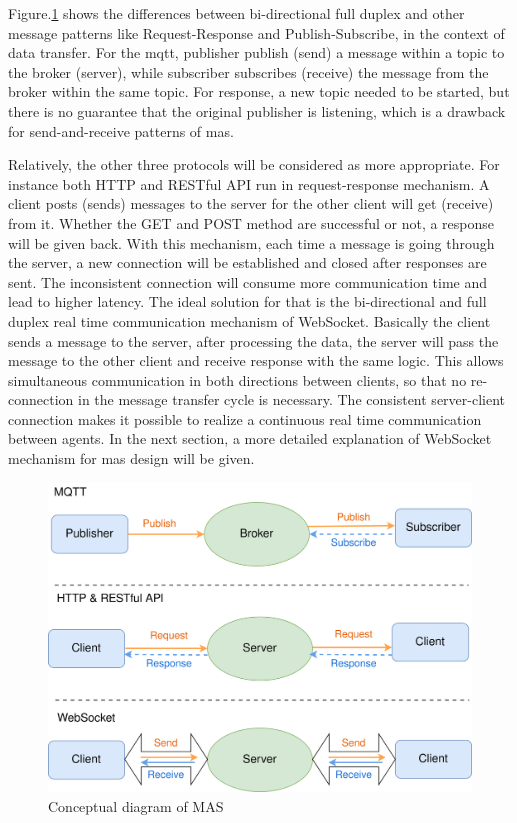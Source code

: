 Figure.\ref{fig: MsgConceptual} shows the differences between bi-directional full duplex and other message patterns like Request-Response and Publish-Subscribe, in the context of data transfer. 
For the \gls{mqtt}, publisher publish (send) a message within a topic to the broker (server), while subscriber subscribes (receive) the message from the broker within the same topic. 
For response, a new topic needed to be started, but there is no guarantee that the original publisher is listening, which is a drawback for send-and-receive patterns of \gls{mas}. 

Relatively, the other three protocols will be considered as more appropriate. 
For instance both HTTP and RESTful API run in request-response mechanism. 
A client posts (sends) messages to the server for the other client will get (receive) from it. 
Whether the GET and POST method are successful or not, a response will be given back. With this mechanism, each time a message is going through the server, a new connection will be established and closed after responses are sent. 
The inconsistent connection will consume more communication time and lead to higher latency. 
The ideal solution for that is the bi-directional and full duplex real time communication mechanism of WebSocket. 
Basically the client sends a message to the server, after processing the data, the server will pass the message to the other client and receive response with the same logic. This allows simultaneous communication in both directions between clients, so that no re-connection in the message transfer cycle is necessary. The consistent server-client connection makes it possible to realize a continuous real time communication between agents. In the next section, a more detailed explanation of WebSocket mechanism for \gls{mas} design will be given.

\begin{figure}[htb]
\includegraphics[width=12cm]{figures/MessageConceptual.png}
\centering
\caption{Conceptual diagram of MAS\label{fig: MsgConceptual}}
\end{figure}


